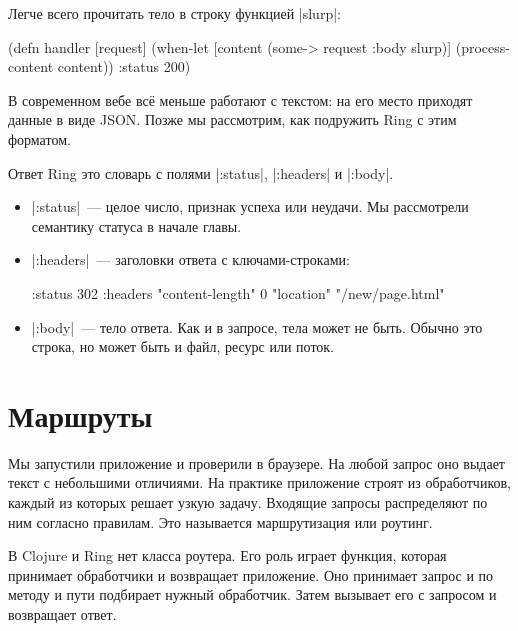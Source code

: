 Легче всего прочитать тело в строку функцией \spverb|slurp|:

\begin{english}
  \begin{clojure}
(defn handler [request]
  (when-let [content (some-> request :body slurp)]
    (process-content content))
  {:status 200})
  \end{clojure}
\end{english}

В современном вебе вс\"{е} меньше работают с текстом: на его место приходят данные в
виде JSON. Позже мы рассмотрим, как подружить Ring с этим форматом.


Ответ Ring это словарь с полями \spverb|:status|, \spverb|:headers| и
\spverb|:body|.

\begin{itemize}

\item
  \spverb|:status|~--- целое число, признак успеха или неудачи. Мы рассмотрели
  семантику статуса в начале главы.

\item
  \spverb|:headers|~--- заголовки ответа с ключами-строками:

\begin{english}
  \begin{clojure}
{:status 302
 :headers {"content-length" 0
           "location" "/new/page.html"}}
  \end{clojure}
\end{english}

\item
  \spverb|:body|~--- тело ответа. Как и в запросе, тела может не быть. Обычно
  это строка, но может быть и файл, ресурс или поток.

\end{itemize}

\section{Маршруты}

Мы запустили приложение и проверили в браузере. На любой запрос оно выдает текст
с небольшими отличиями. На практике приложение строят из обработчиков, каждый из
которых решает узкую задачу. Входящие запросы распределяют по ним согласно
правилам. Это называется маршрутизация или роутинг.

В Clojure и Ring нет класса роутера. Его роль играет функция, которая принимает
обработчики и возвращает приложение. Оно принимает запрос и по методу и пути
подбирает нужный обработчик. Затем вызывает его с запросом и возвращает ответ.

